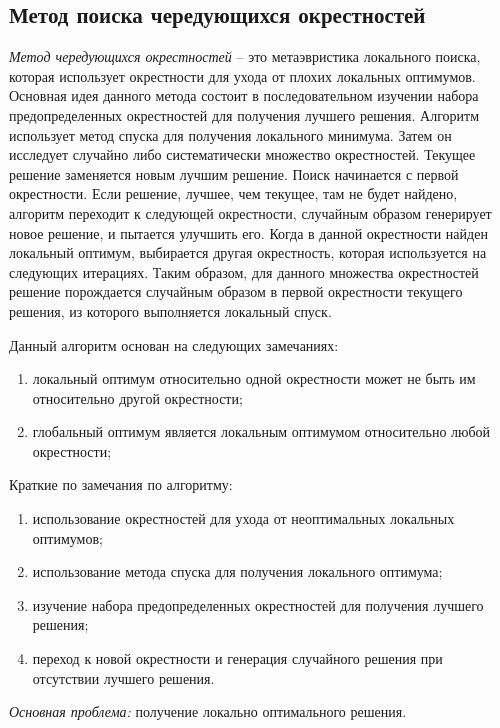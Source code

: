 \subsection{Метод поиска чередующихся окрестностей}
\emph{Метод чередующихся окрестностей} -- это метаэвристика локального поиска, которая использует окрестности 
для ухода от плохих локальных оптимумов. Основная идея данного метода состоит в последовательном изучении 
набора предопределенных окрестностей для получения лучшего решения. Алгоритм использует метод спуска для 
получения локального минимума. Затем он исследует случайно либо систематически множество окрестностей. 
Текущее решение заменяется новым лучшим решение. Поиск начинается с первой окрестности. Если решение, лучшее, 
чем текущее, там не будет найдено, алгоритм переходит к следующей окрестности, случайным образом генерирует 
новое решение, и пытается улучшить его. Когда в данной окрестности найден локальный оптимум, выбирается 
другая окрестность, которая используется на следующих итерациях. Таким образом, для данного множества 
окрестностей решение порождается случайным образом в первой окрестности текущего решения, из которого 
выполняется локальный спуск.

Данный алгоритм основан на следующих замечаниях:
\begin{enumerate}
    \item локальный оптимум относительно одной окрестности может не быть им относительно другой окрестности;
    \item глобальный оптимум является локальным оптимумом относительно любой окрестности;
\end{enumerate}

Краткие по замечания по алгоритму:
\begin{enumerate}
    \item использование окрестностей для ухода от неоптимальных локальных оптимумов;
    \item использование метода спуска для получения локального оптимума;
    \item изучение набора предопределенных окрестностей для получения лучшего решения;
    \item переход к новой окрестности и генерация случайного решения при отсутствии лучшего решения.
\end{enumerate}

\emph{Основная проблема:} получение локально оптимального решения.

